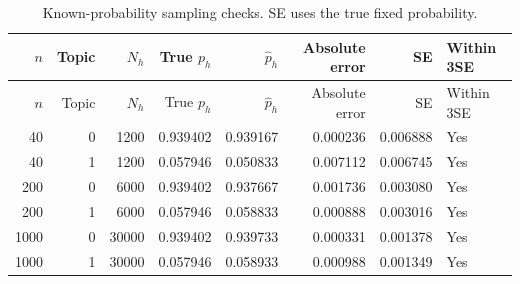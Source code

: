 {\small\renewcommand{\arraystretch}{1.05}
\begin{longtable}{rrrrrrrl}
\caption{Known-probability sampling checks. SE uses the true fixed probability.}\\
\toprule
$n$ & Topic & $N_h$ & True $p_h$ & $\widehat p_h$ & Absolute error & SE & Within 3SE \\ \midrule\endfirsthead
\toprule
$n$ & Topic & $N_h$ & True $p_h$ & $\widehat p_h$ & Absolute error & SE & Within 3SE \\ \midrule\endhead
40 & 0 & 1200 & 0.939402 & 0.939167 & 0.000236 & 0.006888 & Yes \\
40 & 1 & 1200 & 0.057946 & 0.050833 & 0.007112 & 0.006745 & Yes \\
200 & 0 & 6000 & 0.939402 & 0.937667 & 0.001736 & 0.003080 & Yes \\
200 & 1 & 6000 & 0.057946 & 0.058833 & 0.000888 & 0.003016 & Yes \\
1000 & 0 & 30000 & 0.939402 & 0.939733 & 0.000331 & 0.001378 & Yes \\
1000 & 1 & 30000 & 0.057946 & 0.058933 & 0.000988 & 0.001349 & Yes \\
\bottomrule
\end{longtable}
}
